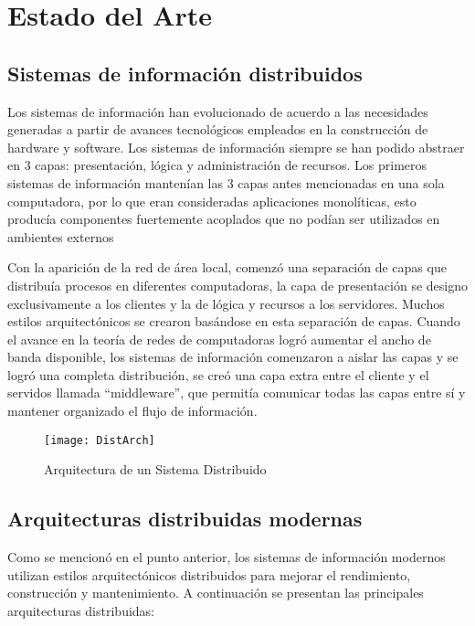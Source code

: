 \section{ Estado del Arte }

\subsection{ Sistemas de información distribuidos }

Los sistemas de información han evolucionado de acuerdo a las necesidades generadas a partir de avances tecnológicos empleados en la construcción de hardware y software. Los sistemas de información siempre se han podido abstraer en 3 capas: presentación, lógica y administración de recursos.
Los primeros sistemas de información mantenían las 3 capas antes mencionadas en una sola computadora, por lo que eran consideradas aplicaciones monolíticas, esto producía componentes fuertemente acoplados que no podían ser utilizados en ambientes externos

Con la aparición de la red de área local, comenzó una separación de capas que distribuía procesos en diferentes computadoras, la capa de presentación se designo exclusivamente a los clientes y la de lógica y recursos a los servidores. Muchos estilos arquitectónicos se crearon basándose en esta separación de capas.
Cuando el avance en la teoría de redes de computadoras logró aumentar el ancho de banda disponible, los sistemas de información comenzaron a aislar las capas y se logró una completa distribución, se creó una capa extra entre el cliente y el servidos llamada “middleware”, que permitía comunicar todas las capas entre sí y mantener organizado el flujo de información.

\begin{figure}[H]
  \begin{center}
    \texttt{[image: DistArch]}
  \end{center}
  \caption{Arquitectura de un Sistema Distribuido}
\end{figure}

\subsection{ Arquitecturas distribuidas modernas }
Como se mencionó en el punto anterior, los sistemas de información modernos utilizan estilos arquitectónicos distribuidos para mejorar el rendimiento, construcción y mantenimiento. A continuación se presentan las principales arquitecturas distribuidas: 

